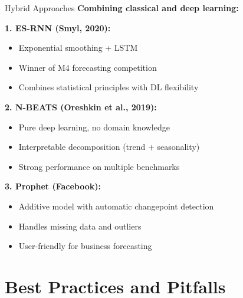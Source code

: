 \documentclass[aspectratio=169]{beamer}
\begin{document}
\begin{frame}{Hybrid Approaches}
  \textbf{Combining classical and deep learning:}

  \vspace{0.5em}

  \textbf{1. ES-RNN (Smyl, 2020):}
  \begin{itemize}
    \item Exponential smoothing + LSTM
    \item Winner of M4 forecasting competition
    \item Combines statistical principles with DL flexibility
  \end{itemize}

  \vspace{0.5em}

  \textbf{2. N-BEATS (Oreshkin et al., 2019):}
  \begin{itemize}
    \item Pure deep learning, no domain knowledge
    \item Interpretable decomposition (trend + seasonality)
    \item Strong performance on multiple benchmarks
  \end{itemize}

  \vspace{0.5em}

  \textbf{3. Prophet (Facebook):}
  \begin{itemize}
    \item Additive model with automatic changepoint detection
    \item Handles missing data and outliers
    \item User-friendly for business forecasting
  \end{itemize}
\end{frame}

\section{Best Practices and Pitfalls}
\end{document}
